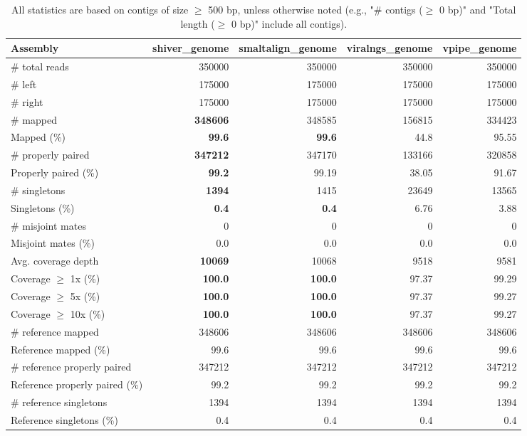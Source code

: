 \documentclass[12pt,a4paper]{article}
\begin{document}
\begin{table}[ht]
\begin{center}
\caption{All statistics are based on contigs of size $\geq$ 500 bp, unless otherwise noted (e.g., "\# contigs ($\geq$ 0 bp)" and "Total length ($\geq$ 0 bp)" include all contigs).}
\begin{tabular}{|l*{4}{|r}|}
\hline
Assembly & shiver\_genome & smaltalign\_genome & viralngs\_genome & vpipe\_genome \\ \hline
\# total reads & 350000 & 350000 & 350000 & 350000 \\ \hline
\# left & 175000 & 175000 & 175000 & 175000 \\ \hline
\# right & 175000 & 175000 & 175000 & 175000 \\ \hline
\# mapped & {\bf 348606} & 348585 & 156815 & 334423 \\ \hline
Mapped (\%) & {\bf 99.6} & {\bf 99.6} & 44.8 & 95.55 \\ \hline
\# properly paired & {\bf 347212} & 347170 & 133166 & 320858 \\ \hline
Properly paired (\%) & {\bf 99.2} & 99.19 & 38.05 & 91.67 \\ \hline
\# singletons & {\bf 1394} & 1415 & 23649 & 13565 \\ \hline
Singletons (\%) & {\bf 0.4} & {\bf 0.4} & 6.76 & 3.88 \\ \hline
\# misjoint mates & 0 & 0 & 0 & 0 \\ \hline
Misjoint mates (\%) & 0.0 & 0.0 & 0.0 & 0.0 \\ \hline
Avg. coverage depth & {\bf 10069} & 10068 & 9518 & 9581 \\ \hline
Coverage $\geq$ 1x (\%) & {\bf 100.0} & {\bf 100.0} & 97.37 & 99.29 \\ \hline
Coverage $\geq$ 5x (\%) & {\bf 100.0} & {\bf 100.0} & 97.37 & 99.27 \\ \hline
Coverage $\geq$ 10x (\%) & {\bf 100.0} & {\bf 100.0} & 97.37 & 99.27 \\ \hline
\# reference mapped & 348606 & 348606 & 348606 & 348606 \\ \hline
Reference mapped (\%) & 99.6 & 99.6 & 99.6 & 99.6 \\ \hline
\# reference properly paired & 347212 & 347212 & 347212 & 347212 \\ \hline
Reference properly paired (\%) & 99.2 & 99.2 & 99.2 & 99.2 \\ \hline
\# reference singletons & 1394 & 1394 & 1394 & 1394 \\ \hline
Reference singletons (\%) & 0.4 & 0.4 & 0.4 & 0.4 \\ \hline

\end{tabular}
\end{center}
\end{table}
\end{document}
